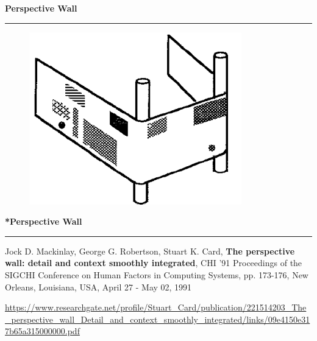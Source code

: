 \documentclass[pdf]{beamer}
\begin{document}
\begin{frame}
{\textbf{Perspective Wall}}{\textcolor{red}{\rule{12cm}{1.2pt}}}

\begin{figure}
\includegraphics[scale=0.7]{39_Picture2.png}
\end{figure}

\end{frame}



\begin{frame}
{\textbf{*Perspective Wall}}{\textcolor{red}{\rule{12cm}{1.2pt}}}

Jock D. Mackinlay, George G. Robertson, Stuart K. Card, \textbf{The perspective wall: detail and context smoothly integrated}, CHI '91 Proceedings of the SIGCHI Conference on Human Factors in Computing Systems, pp. 173-176, New Orleans, Louisiana, USA, April 27 - May 02, 1991 
\newline

\url{https://www.researchgate.net/profile/Stuart_Card/publication/221514203_The_perspective_wall_Detail_and_context_smoothly_integrated/links/09e4150e317b65a315000000.pdf}

\end{frame}



\end{document}
